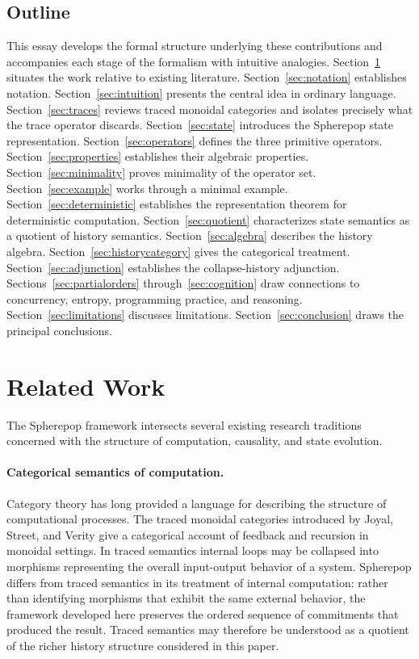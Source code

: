 \documentclass[12pt]{article}
\begin{document}
\subsection{Outline}

This essay develops the formal structure underlying these contributions and accompanies each stage of the formalism with intuitive analogies. Section~\ref{sec:related} situates the work relative to existing literature. Section~\ref{sec:notation} establishes notation. Section~\ref{sec:intuition} presents the central idea in ordinary language. Section~\ref{sec:traces} reviews traced monoidal categories and isolates precisely what the trace operator discards. Section~\ref{sec:state} introduces the Spherepop state representation. Section~\ref{sec:operators} defines the three primitive operators. Section~\ref{sec:properties} establishes their algebraic properties. Section~\ref{sec:minimality} proves minimality of the operator set. Section~\ref{sec:example} works through a minimal example. Section~\ref{sec:deterministic} establishes the representation theorem for deterministic computation. Section~\ref{sec:quotient} characterizes state semantics as a quotient of history semantics. Section~\ref{sec:algebra} describes the history algebra. Section~\ref{sec:historycategory} gives the categorical treatment. Section~\ref{sec:adjunction} establishes the collapse-history adjunction. Sections~\ref{sec:partialorders} through~\ref{sec:cognition} draw connections to concurrency, entropy, programming practice, and reasoning. Section~\ref{sec:limitations} discusses limitations. Section~\ref{sec:conclusion} draws the principal conclusions.

\section{Related Work}
\label{sec:related}

The Spherepop framework intersects several existing research traditions concerned with the structure of computation, causality, and state evolution.

\paragraph{Categorical semantics of computation.} Category theory has long provided a language for describing the structure of computational processes. The traced monoidal categories introduced by Joyal, Street, and Verity \cite{joyal1996} give a categorical account of feedback and recursion in monoidal settings. In traced semantics internal loops may be collapsed into morphisms representing the overall input-output behavior of a system. Spherepop differs from traced semantics in its treatment of internal computation: rather than identifying morphisms that exhibit the same external behavior, the framework developed here preserves the ordered sequence of commitments that produced the result. Traced semantics may therefore be understood as a quotient of the richer history structure considered in this paper.
\end{document}
